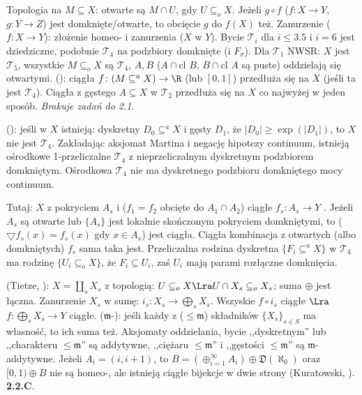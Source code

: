 Topologia   na $M \subseteq X$: otwarte są $M \cap U$, gdy $U \subseteq_o X$.
Jeżeli $g \circ f$ ($f \colon X \to Y$, $g \colon Y \to Z$) jest domknięte/otwarte, to obcięcie $g$ do $f(X)$ też.
Zanurzenie  ($f \colon X \to Y$): złożenie homeo- i zanurzenia ($X$  w $Y$).
Bycie $\mathcal T_i$ dla $i \le 3.5$ i $i = 6$ jest dziedziczne, podobnie $\mathcal T_4$ na podzbiory domknięte (i $F_\sigma$).
Dla $\mathcal T_1$ NWSR: $X$ jest $\mathcal T_5$, wszystkie $M \subseteq_o X$ są $\mathcal T_4$,  $A, B$ ($A \cap \text{cl } B$, $B \cap \text{cl } A$ są puste) oddzielają się otwartymi.
 (): ciągła $f \colon (M \subseteq^a X) \to \R$ (lub $[0,1]$) przedłuża się na $X$ (jeśli ta jest $\mathcal T_4$).
Ciągła z gęstego $A \subseteq X$ w $\mathcal T_2$ przedłuża się na $X$ co najwyżej w jeden sposób.
\emph{Brakuje zadań do 2.1}.

 (): jeśli w $X$ istnieją: dyskretny $D_0 \subseteq^a X$ i gęsty $D_1$, że $|D_0| \ge \exp(|D_1|)$, to $X$ nie jest $\mathcal T_4$.
Zakładając aksjomat Martina i negację hipotezy continuum, istnieją ośrodkowe 1-przeliczalne $\mathcal T_4$ z nieprzeliczalnym dyskretnym podzbiorem domkniętym.
Ośrodkowa $\mathcal T_4$ nie ma dyskretnego podzbioru domkniętego mocy continuum.

Tutaj: $X$ z pokryciem $A_s$ i  ($f_{1} = f_{2}$ obcięte do $A_1 \cap A_2$) ciągłe $f_s \colon A_s \to Y$ .
Jeżeli $A_s$ są otwarte lub $\{A_s\}$ jest lokalnie skończonym pokryciem domkniętymi, to  ($\bigtriangledown f_s(x) = f_s(x)$ gdy $x \in A_s$) jest ciągła.
Ciągła kombinacja z otwartych (albo domkniętych) $f_s$ sama taka jest.
Przeliczalna rodzina dyskretna $\{F_i \subseteq^a X\}$ w $\mathcal T_4$ ma rodzinę $\{U_i \subseteq_o X\}$, że $F_i \subseteq U_i$, zaś $U_i$ mają parami rozłączne domknięcia.

  (Tietze, ): $X = \coprod_s X_s$ z topologią: $U \subseteq_o X \Lra U \cap X_s \subseteq_o X_s$; suma $\oplus$ jest łączna.
Zanurzenie $X_s$ w sumę: $i_s \colon X_s \to \bigoplus_s X_s$.
Wszyskie $f \circ i_s$ ciągłe $\Lra$ $f \colon \bigoplus_s X_s \to Y$ ciągłe.
 ($\mathfrak m$-): jeśli każdy z ($\le \mathfrak m$) składników $\{X_s\}_{s\in S}$ ma własność, to ich suma też.
Aksjomaty oddzielania, bycie ,,dyskretnym'' lub ,,charakteru $\le \mathfrak m$'' są addytywne, ,,ciężaru $\le \mathfrak m$'' i ,,gęstości $\le \mathfrak m$'' są $\mathfrak m$-addytywne.
Jeżeli $A_i = (i, i+1)$, to $B = (\oplus_{i=1}^\infty A_i) \oplus \mathfrak D(\aleph_0)$ oraz $[0,1) \oplus B$ nie są homeo-, ale istnieją ciągłe bijekcje w dwie strony (Kuratowski, ).
\textbf{\color{Red}2.2.C}.

